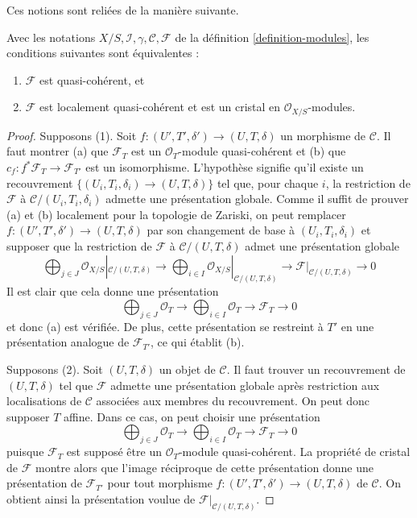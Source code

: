 \noindent
Ces notions sont reliées de la manière suivante.

\begin{lemma}
\label{lemma-crystal-quasi-coherent-modules}
Avec les notations $X/S, \mathcal{I}, \gamma, \mathcal{C}, \mathcal{F}$
de la définition \ref{definition-modules}, les conditions suivantes sont équivalentes :
\begin{enumerate}
\item $\mathcal{F}$ est quasi-cohérent, et
\item $\mathcal{F}$ est localement quasi-cohérent et est un cristal en
$\mathcal{O}_{X/S}$-modules.
\end{enumerate}
\end{lemma}

\begin{proof}
Supposons (1). Soit $f : (U', T', \delta') \to (U, T, \delta)$ un morphisme de
$\mathcal{C}$. Il faut montrer (a) que $\mathcal{F}_T$ est un
$\mathcal{O}_T$-module quasi-cohérent et (b) que $c_f : f^*\mathcal{F}_T \to \mathcal{F}_{T'}$
est un isomorphisme. L'hypothèse signifie qu'il existe un recouvrement
$\{(U_i, T_i, \delta_i) \to (U, T, \delta)\}$ tel que, pour chaque $i$,
la restriction de $\mathcal{F}$ à $\mathcal{C}/(U_i, T_i, \delta_i)$
admette une présentation globale. Comme il suffit de prouver (a) et (b)
localement pour la topologie de Zariski, on peut remplacer $f : (U', T', \delta') \to (U, T, \delta)$
par son changement de base à $(U_i, T_i, \delta_i)$ et supposer que la restriction de $\mathcal{F}$
à $\mathcal{C}/(U, T, \delta)$ admet une
présentation globale
$$
\bigoplus\nolimits_{j \in J}
\mathcal{O}_{X/S}|_{\mathcal{C}/(U, T, \delta)} \longrightarrow
\bigoplus\nolimits_{i \in I}
\mathcal{O}_{X/S}|_{\mathcal{C}/(U, T, \delta)} \longrightarrow
\mathcal{F}|_{\mathcal{C}/(U, T, \delta)}
\longrightarrow 0
$$
Il est clair que cela donne une présentation
$$
\bigoplus\nolimits_{j \in J} \mathcal{O}_T \longrightarrow
\bigoplus\nolimits_{i \in I} \mathcal{O}_T \longrightarrow
\mathcal{F}_T
\longrightarrow 0
$$
et donc (a) est vérifiée. De plus, cette présentation se restreint à $T'$
en une présentation analogue de $\mathcal{F}_{T'}$, ce qui établit (b).

\medskip\noindent
Supposons (2). Soit $(U, T, \delta)$ un objet de $\mathcal{C}$.
Il faut trouver un recouvrement de $(U, T, \delta)$ tel que $\mathcal{F}$ admette une
présentation globale après restriction aux localisations de $\mathcal{C}$
associées aux membres du recouvrement. On peut donc supposer $T$ affine.
Dans ce cas, on peut choisir une présentation
$$
\bigoplus\nolimits_{j \in J} \mathcal{O}_T \longrightarrow
\bigoplus\nolimits_{i \in I} \mathcal{O}_T \longrightarrow
\mathcal{F}_T
\longrightarrow 0
$$
puisque $\mathcal{F}_T$ est supposé être un $\mathcal{O}_T$-module quasi-cohérent.
La propriété de cristal de $\mathcal{F}$ montre alors que l'image réciproque de cette présentation donne
une présentation de $\mathcal{F}_{T'}$ pour tout morphisme
$f : (U', T', \delta') \to (U, T, \delta)$ de $\mathcal{C}$.
On obtient ainsi la présentation voulue de $\mathcal{F}|_{\mathcal{C}/(U, T, \delta)}$.
\end{proof}

